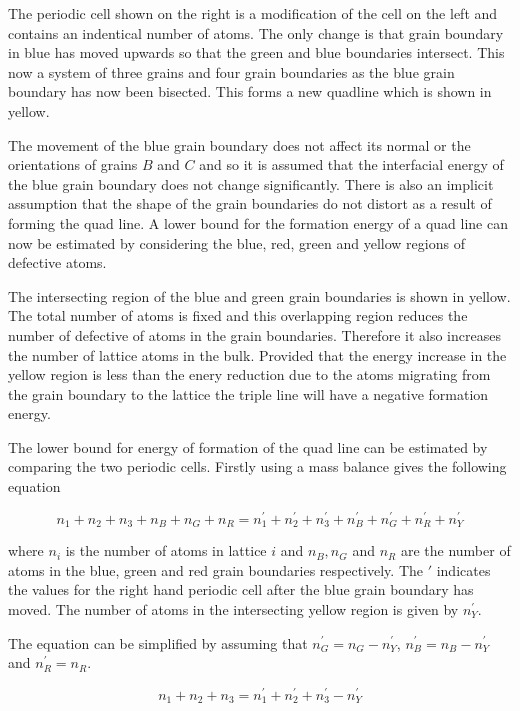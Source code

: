 \documentclass[12pt,a4paper]{book}
\begin{document}
The periodic cell shown on the right is a modification of the cell on the left and contains an indentical number of atoms. The only change is that grain boundary in blue has moved upwards so that the green and blue boundaries intersect. This now a system of three grains and four grain boundaries as the blue grain boundary has now been bisected. This forms a new quadline which is shown in yellow.

The movement of the blue grain boundary does not affect its normal  or the orientations of grains $B$ and $C$ and so it is assumed that the interfacial energy of the blue grain boundary does not change significantly. There is also an implicit assumption that the shape of the grain boundaries do not distort as a result of forming the quad line. A lower bound for the formation energy of a quad line can now be estimated by considering the blue, red, green and yellow regions of defective atoms.

The intersecting region of the blue and green grain boundaries is shown in yellow. The total number of atoms is fixed and this overlapping region reduces the number of defective of atoms in the grain boundaries. Therefore it also increases the number of lattice atoms in the bulk. Provided that the energy increase in the yellow region is less than the enery reduction due to the atoms migrating from the grain boundary to the lattice the triple line will have a negative formation energy. 
 
The lower bound for energy of formation of the quad line can be estimated by comparing the two periodic cells. Firstly using a mass balance gives the following equation

\[ n_1 + n_2 + n_3 + n_B + n_G + n_R = n_1^{\prime} + n_2^{\prime} + n_3^{\prime} + n_B^{\prime} + n_G^{\prime} + n_R^{\prime} +
n_Y^{\prime} \]

where $n_i$ is the number of atoms in lattice $i$ and $n_B, n_G$ and $n_R$ are the number of atoms in the blue, green and red grain boundaries respectively. The $\prime$ indicates the values for the right hand periodic cell after the blue grain boundary has moved.  The number of atoms in the intersecting yellow region is given by $n_Y^{\prime}$.

The equation can be simplified by assuming that $n_G^{\prime} = n_G-n_Y^{\prime}$, $n_B^{\prime} = n_B-n_Y^{\prime}$ and $n_R^{\prime} = n_R$. 

\[ n_1 + n_2 + n_3   = n_1^{\prime} + n_2^{\prime} + n_3^{\prime}- n_Y^{\prime} \]
\end{document}
